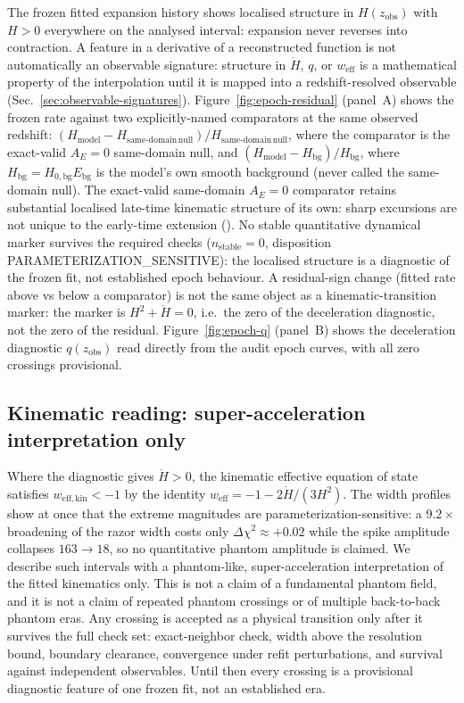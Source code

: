 The frozen fitted expansion history shows localised structure in
$H(z_{\mathrm{obs}})$ with $H > 0$ everywhere on the analysed interval:
expansion never reverses into contraction. A feature in a derivative
of a reconstructed function is not automatically an observable
signature: structure in $\dot{H}$, $q$, or $w_{\mathrm{eff}}$ is a
mathematical property of the interpolation until it is mapped into a
redshift-resolved observable (Sec.~\ref{sec:observable-signatures}).
Figure~\ref{fig:epoch-residual} (panel~A) shows the
frozen rate against two explicitly-named comparators at the same
observed redshift:
$(H_{\mathrm{model}} - H_{\mathrm{same\text{-}domain\,null}})/H_{\mathrm{same\text{-}domain\,null}}$,
where the comparator is the exact-valid $A_{E} = 0$ same-domain null,
and $(H_{\mathrm{model}} - H_{\mathrm{bg}})/H_{\mathrm{bg}}$, where
$H_{\mathrm{bg}} = H_{0,\mathrm{bg}}E_{\mathrm{bg}}$ is the model's own
smooth background (never called the same-domain null). The exact-valid
same-domain $A_{E} = 0$ comparator retains substantial localised
late-time kinematic structure of its own: sharp excursions are not
unique to the early-time extension
().
No stable quantitative dynamical marker survives the required checks
($n_{\mathrm{stable}} = 0$, disposition
PARAMETERIZATION\_SENSITIVE): the localised
structure is a diagnostic of the frozen fit, not established epoch
behaviour. A residual-sign change (fitted rate above vs below a
comparator) is not the same object as a kinematic-transition marker: the
marker is $H^{2} + \dot{H} = 0$, i.e.\ the zero of the deceleration
diagnostic, not the zero of the residual. Figure~\ref{fig:epoch-q} (panel~B) shows the
deceleration diagnostic $q(z_{\mathrm{obs}})$ read directly from the
audit epoch curves, with all zero crossings provisional.

\subsection{Kinematic reading: super-acceleration interpretation only}

Where the diagnostic gives $\dot{H} > 0$, the kinematic effective
equation of state satisfies $w_{\mathrm{eff,kin}} < -1$ by the identity
$w_{\mathrm{eff}} = -1 - 2\dot{H}/(3H^{2})$. The width profiles show at
once that the extreme magnitudes are parameterization-sensitive: a
$9.2\times$ broadening of the razor width costs only
$\Delta\chi^{2} \approx +0.02$ while the spike amplitude collapses
$163 \to 18$, so no quantitative phantom amplitude is claimed. We
describe such intervals with a phantom-like, super-acceleration
interpretation of the fitted kinematics only. This is not a claim of a
fundamental phantom field, and it is not a claim of repeated phantom
crossings or of multiple back-to-back phantom eras. Any crossing is
accepted as a physical transition only after it survives the full check
set: exact-neighbor check, width above the resolution bound, boundary
clearance, convergence under refit perturbations, and survival against
independent observables. Until then every crossing is a provisional
diagnostic feature of one frozen fit, not an established era.

